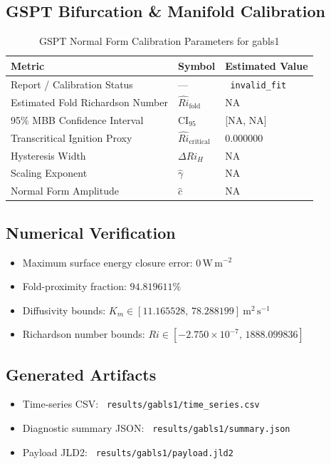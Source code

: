 \subsection{GSPT Bifurcation \& Manifold Calibration}
\begin{table}[htbp]
\centering
\caption{GSPT Normal Form Calibration Parameters for gabls1}
\label{tab:gspt_calibration_gabls1_gabls1_80x2m_9h_report}
\begin{tabular}{lll}
\hline
{\bfseries Metric} & {\bfseries Symbol} & {\bfseries Estimated Value} \\
\hline
Report / Calibration Status & --- & \texttt{ invalid\_fit } \\
Estimated Fold Richardson Number & $\hat{Ri}_{\mathrm{fold}}$ & NA \\
95\% MBB Confidence Interval & CI$_{95}$ & [NA, NA] \\
Transcritical Ignition Proxy & $\hat{Ri}_{\mathrm{critical}}$ & 0.000000 \\
Hysteresis Width & $\Delta Ri_H$ & NA \\
Scaling Exponent & $\hat{\gamma}$ & NA \\
Normal Form Amplitude & $\hat{c}$ & NA \\
\hline
\end{tabular}
\end{table}

\subsection{Numerical Verification}
\begin{itemize}
  \item Maximum surface energy closure error:
  $0\,\mathrm{W\,m^{-2}}$
  \item Fold-proximity fraction:
  $94.819611\%$
  \item Diffusivity bounds:
  $K_m \in [11.165528,\,78.288199]~\mathrm{m^2\,s^{-1}}$
  \item Richardson number bounds:
  $Ri \in [-2.750 \times 10^{-7},\,1888.099836]$
\end{itemize}

\subsection{Generated Artifacts}
\begin{itemize}
  \item Time-series CSV: \texttt{ results/gabls1/time\_series.csv }
  \item Diagnostic summary JSON: \texttt{ results/gabls1/summary.json }
  \item Payload JLD2: \texttt{ results/gabls1/payload.jld2 }
\end{itemize}

